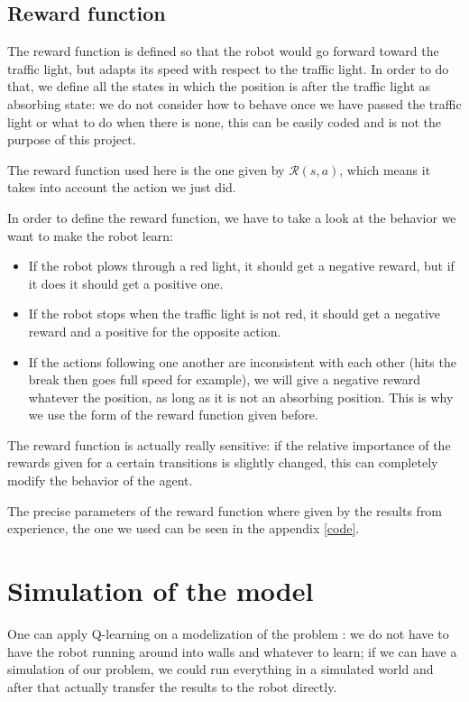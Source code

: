 \documentclass[14pt,a4paper]{article}
\theoremstyle{definition}
\begin{document}
\subsection{Reward function} \label{reward function}

The reward function is defined so that the robot would go forward toward the traffic light, but adapts its speed with respect to the traffic light. In order to do that, we define all the states in which the position is after the traffic light as absorbing state: we do not consider how to behave once we have passed the traffic light or what to do when there is none, this can be easily coded and is not the purpose of this project.

The reward function used here is the one given by $\mathcal{R}(s,a)$, which means it takes into account the action we just did.

In order to define the reward function, we have to take a look at the behavior we want to make the robot learn: 
\begin{itemize}
\item If the robot plows through a red light, it should get a negative reward, but if it does it should get a positive one.
\item If the robot stops when the traffic light is not red, it should get a negative reward and a positive for the opposite action.
\item If the actions following one another are inconsistent with each other (hits the break then goes full speed for example), we will give a negative reward whatever the position, as long as it is not an absorbing position. This is why we use the form of the reward function given before.
\end{itemize}

The reward function is actually really sensitive: if the relative importance of the rewards given for a certain transitions is slightly changed, this can completely modify the behavior of the agent.




The precise parameters of the reward function where given by the results from experience, the one we used can be seen in the appendix \ref{code}.

\section{Simulation of the model}

One can apply Q-learning on a modelization of the problem : we do not have to have the robot running around into walls and whatever to learn; if we can have a simulation of our problem, we could run everything in a simulated world and after that actually transfer the results to the robot directly.
\end{document}

